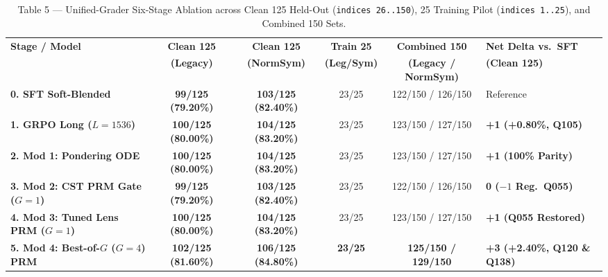 \documentclass[11pt,a4paper]{article}
\begin{document}
\begin{table}[htbp]
\centering
\caption{Table 5 --- Unified-Grader Six-Stage Ablation across Clean 125 Held-Out (\texttt{indices 26..150}), 25 Training Pilot (\texttt{indices 1..25}), and Combined 150 Sets.}
\label{tab:step3_unified}
\footnotesize
\begin{tabular}{@{}lccccl@{}}
\toprule
\textbf{Stage / Model} & \textbf{Clean 125} & \textbf{Clean 125} & \textbf{Train 25} & \textbf{Combined 150} & \textbf{Net Delta vs.\ SFT} \\
 & \textbf{(Legacy)} & \textbf{(NormSym)} & \textbf{(Leg/Sym)} & \textbf{(Legacy / NormSym)} & \textbf{(Clean 125)} \\
\midrule
\textbf{0. SFT Soft-Blended} & \textbf{99/125 (79.20\%)} & \textbf{103/125 (82.40\%)} & 23/25 & 122/150 / 126/150 & Reference \\
\textbf{1. GRPO Long ($L=1536$)} & \textbf{100/125 (80.00\%)} & \textbf{104/125 (83.20\%)} & 23/25 & 123/150 / 127/150 & \textbf{+1 (+0.80\%, Q105)} \\
\textbf{2. Mod 1: Pondering ODE} & \textbf{100/125 (80.00\%)} & \textbf{104/125 (83.20\%)} & 23/25 & 123/150 / 127/150 & \textbf{+1 (100\% Parity)} \\
\textbf{3. Mod 2: CST PRM Gate ($G=1$)} & \textbf{99/125 (79.20\%)} & \textbf{103/125 (82.40\%)} & 23/25 & 122/150 / 126/150 & \textbf{0 ($-1$ Reg.\ Q055)} \\
\textbf{4. Mod 3: Tuned Lens PRM ($G=1$)} & \textbf{100/125 (80.00\%)} & \textbf{104/125 (83.20\%)} & 23/25 & 123/150 / 127/150 & \textbf{+1 (Q055 Restored)} \\
\textbf{5. Mod 4: Best-of-$G$ ($G=4$) PRM} & \textbf{102/125 (81.60\%)} & \textbf{106/125 (84.80\%)} & \textbf{23/25} & \textbf{125/150 / 129/150} & \textbf{+3 (+2.40\%, Q120 \& Q138)} \\
\bottomrule
\end{tabular}
\end{table}
\end{document}
